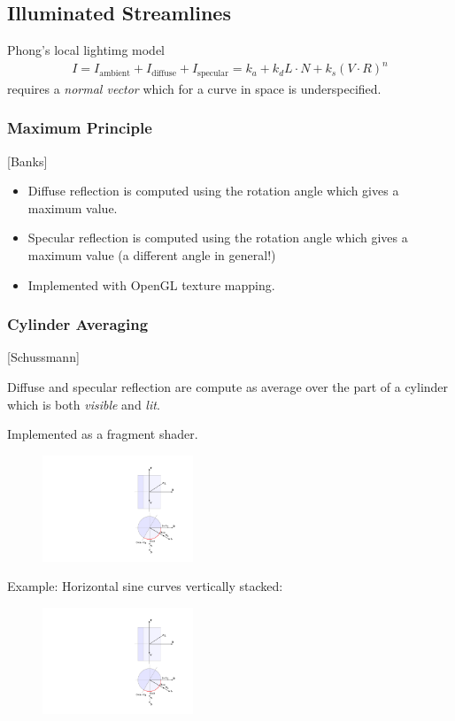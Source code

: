 \subsection{Illuminated Streamlines}
Phong's local lightimg model
\begin{align*}
     I= I_\text{ambient} + I_\text{diffuse} + I_\text{specular} = k_a +k_d L\cdot N+k_s(V\cdot R)^n
\end{align*}
requires a \emph{normal vector} which for a curve in space is underspecified.

\subsubsection{Maximum Principle}
[Banks]
\begin{itemize}
    \item Diffuse reflection is computed using the rotation angle which gives a maximum value.
    \item Specular reflection is computed using the rotation angle which gives a maximum value (a different angle in general!)
    \item Implemented with OpenGL texture mapping.
\end{itemize}

\subsubsection{Cylinder Averaging}
[Schussmann]

Diffuse and specular reflection are compute as average over the part of a cylinder which is both \emph{visible} and \emph{lit}.

Implemented as a fragment shader.

\begin{figure}[H]
\centering
\includegraphics[width=0.4\textwidth,page=1]{img/11_illuminated_streamlines}
\end{figure}

Example: Horizontal sine curves vertically stacked:
\begin{figure}[H]
\centering
\includegraphics[width=0.4\textwidth,page=2]{img/11_illuminated_streamlines}
\end{figure}

